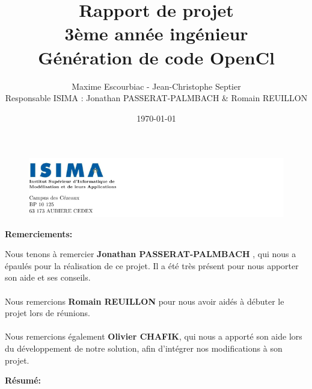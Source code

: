\documentclass[a4paper,11pt]{report}
\begin{document}

\begin{figure}
   \includegraphics[scale = 0.75]{HeaderPagedeGarde.PNG}
\end{figure}
\author{Maxime Escourbiac - Jean-Christophe Septier \\ Responsable ISIMA : Jonathan PASSERAT-PALMBACH \& Romain REUILLON}
\title{
   Rapport de projet \\ 3ème année ingénieur \\Génération de code OpenCl\\
  \bigskip
}
\date{\today}
\maketitle

\newpage

\begin{flushleft}
\LARGE{ \bf {Remerciements:}\bigskip}
\end{flushleft}

\normalsize{

Nous tenons à remercier {\bf Jonathan PASSERAT-PALMBACH} , qui nous a épaulés pour la réalisation de ce projet. Il a été très présent pour nous apporter son aide et ses conseils.
\\ \\
Nous remercions {\bf Romain REUILLON} pour nous avoir aidés à débuter le projet lors de réunions.
\\ \\
Nous remercions également {\bf Olivier CHAFIK}, qui nous a apporté son aide lors du développement de notre solution, afin d’intégrer nos modifications à son projet. 

}

\newpage

\listoffigures

\newpage
\begin{flushleft}
\LARGE{ \bf {Résumé:}\bigskip}
\end{flushleft}
\end{document}
